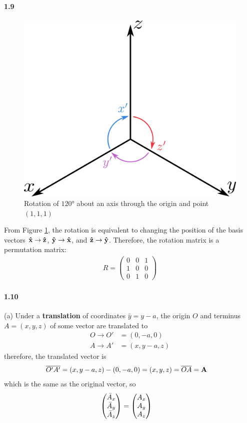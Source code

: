 \documentclass[../main.tex]{subfiles}
\begin{document}
\paragraph{1.9}
\begin{figure}[ht]
    \centering
    \includegraphics[width=0.4\linewidth]{images/fig1_9.png}
    \caption{Rotation of $\ang{120}$ about an axis through the origin and point $(1, 1, 1)$}
    \label{fig:1.9}
\end{figure}
From Figure \ref{fig:1.9}, the rotation is equivalent to changing the position of the basis vectors
$\vu{x} \to \vu{z}$, $\vu{y} \to \vu{x}$, and $\vu{z} \to \vu{y}$. Therefore, the rotation matrix is
a permutation matrix:
\begin{align*}
    R = \begin{pmatrix}
        0 & 0 & 1 \\
        1 & 0 & 0 \\
        0 & 1 & 0
    \end{pmatrix}
\end{align*}

\paragraph{1.10}
(a) Under a \textbf{translation} of coordinates $\bar{y} = y - a$, the origin $O$ and terminus
$A = (x, y, z)$ of some vector are translated to
\begin{align*}
    O \to O' &= (0, -a, 0)\\
    A \to A' &= (x, y - a, z)
\end{align*}
therefore, the translated vector is
\begin{align*}
    \overline{O'A'} &= (x, y - a, z) - (0, -a, 0) = (x, y, z) = \overline{OA} = \vb{A}
\end{align*}
which is the same as the original vector, so
\begin{align*}
    \mqty(\bar{A}_x \\ \bar{A}_y \\ \bar{A}_z) &=  \mqty(A_x \\ A_y \\ A_z)
\end{align*}
\end{document}
